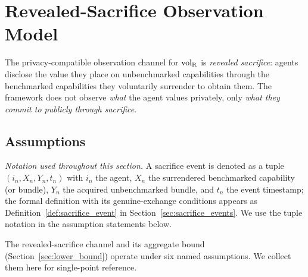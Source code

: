 \section{Revealed-Sacrifice Observation Model}
\label{sec:sacrifice_model}

The privacy-compatible observation channel for ${\operatorname{vol}_{\mathrm{R}}}$ is
\emph{revealed sacrifice}: agents disclose the value they place on
unbenchmarked capabilities through the benchmarked capabilities
they voluntarily surrender to obtain them.  The framework does not
observe \emph{what} the agent values privately, only \emph{what
they commit to publicly through sacrifice}.

\subsection{Assumptions}
\label{sec:assumptions}

\noindent\emph{Notation used throughout this section.}  A sacrifice
event is denoted as a tuple $(i_n, X_n, Y_n, t_n)$ with $i_n$ the
agent, $X_n$ the surrendered benchmarked capability (or bundle),
$Y_n$ the acquired unbenchmarked bundle, and $t_n$ the event
timestamp; the formal definition with its genuine-exchange
conditions appears as Definition~\ref{def:sacrifice_event} in
Section~\ref{sec:sacrifice_events}.  We use the tuple notation
in the assumption statements below.

The revealed-sacrifice channel and its aggregate bound
(Section~\ref{sec:lower_bound}) operate under six named
assumptions.  We collect them here for single-point reference.

